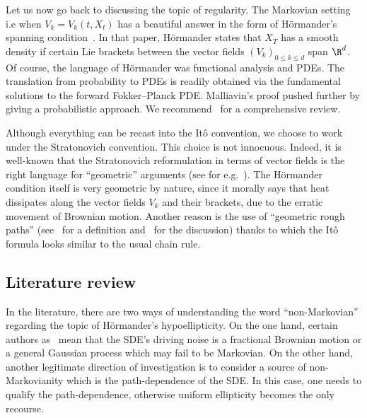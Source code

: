 Let us now go back to discussing the topic of regularity. The Markovian setting i.e when $V_k = V_k(t,X_t)$ has a beautiful answer in the form of H\"ormander's spanning condition~\cite{hormander1967}. In that paper, H\"ormander states that $X_T$ has a smooth density if certain Lie brackets between the vector fields $\left(V_k \right)_{0 \leq k \leq d}$ span $\R^d$. Of course, the language of H\"ormander was functional analysis and PDEs. The translation from probability to PDEs is readily obtained via the fundamental solutions to the forward Fokker--Planck PDE. Malliavin's proof pushed further by giving a probabilistic approach. We recommend~\cite{Hairer11} for a comprehensive review.


Although everything can be recast into the Itô convention, we choose to work under the Stratonovich convention. This choice is not innocuous. Indeed, it is well-known that the Stratonovich reformulation in terms of vector fields is the right language for ``geometric'' arguments (see for e.g.~\cite{Hsu}). The H\"ormander condition itself is very geometric by nature, since it morally says that heat dissipates along the vector fields $V_k$ and their brackets, due to the erratic movement of Brownian motion. Another reason is the use of ``geometric rough paths'' (see~\cite[Chapter~2.2]{FH14} for a definition and~\cite[Chapter~3]{FH14} for the discussion) thanks to which the Itô formula looks similar to the usual chain rule.

\subsection*{Literature review}
In the literature, there are two ways of understanding the word ``non-Markovian'' regarding the topic of H\"ormander's hypoellipticity. On the one hand, certain authors as~\cite{CT10,CHLT15,HP13} mean that the SDE's driving noise is a fractional Brownian motion or a general Gaussian process which may fail to be Markovian. On the other hand, another legitimate direction of investigation is to consider a source of non-Markovianity which is the path-dependence of the SDE. In this case, one needs to qualify the path-dependence, otherwise uniform ellipticity becomes the only recourse.

